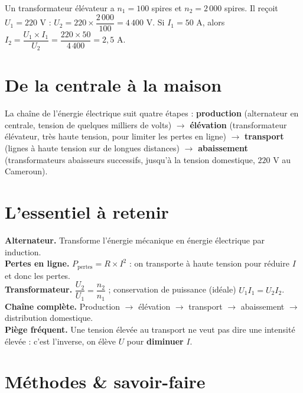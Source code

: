 \begin{exemple}
Un transformateur élévateur a $n_1=100$ spires et $n_2=2\,000$ spires. Il reçoit
$U_1=220$ V : $U_2=220\times\dfrac{2\,000}{100}=4\,400$ V. Si $I_1=50$ A, alors
$I_2=\dfrac{U_1\times I_1}{U_2}=\dfrac{220\times50}{4\,400}=2{,}5$ A.
\end{exemple}

\section{De la centrale à la maison}

\begin{synthese}
La chaîne de l'énergie électrique suit quatre étapes : \textbf{production} (alternateur en
centrale, tension de quelques milliers de volts) $\rightarrow$ \textbf{élévation} (transformateur
élévateur, très haute tension, pour limiter les pertes en ligne) $\rightarrow$
\textbf{transport} (lignes à haute tension sur de longues distances) $\rightarrow$
\textbf{abaissement} (transformateurs abaisseurs successifs, jusqu'à la tension
domestique, $220$ V au Cameroun).
\end{synthese}

\section{L'essentiel à retenir}

\begin{synthese}
\textbf{Alternateur.} Transforme l'énergie mécanique en énergie électrique par
induction.\\[4pt]
\textbf{Pertes en ligne.} $P_{\text{pertes}}=R\times I^2$ : on transporte à haute tension
pour réduire $I$ et donc les pertes.\\[4pt]
\textbf{Transformateur.} $\dfrac{U_2}{U_1}=\dfrac{n_2}{n_1}$ ; conservation de puissance
(idéale) $U_1I_1=U_2I_2$.\\[4pt]
\textbf{Chaîne complète.} Production $\to$ élévation $\to$ transport $\to$ abaissement
$\to$ distribution domestique.\\[4pt]
\textbf{Piège fréquent.} Une tension élevée au transport ne veut pas dire une intensité
élevée : c'est l'inverse, on élève $U$ pour \textbf{diminuer} $I$.
\end{synthese}

\section{Méthodes \& savoir-faire}


